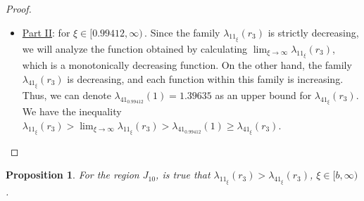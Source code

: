 \documentclass[final,11pt]{article}
\numberwithin{equation}{section}
\newtheorem{proposition}[theorem]{Proposition}
\theoremstyle{definition}
\begin{document}
\begin{proof}
\begin{itemize}
\item \underline{Part II}: for $\xi\in[0.99412, \infty)$\,. Since the family $\lambda_{11_\xi}(r_3)$ is strictly decreasing, we will analyze the function obtained by calculating $\lim_{\xi\rightarrow \infty} \lambda_{11_\xi}(r_3)$, which is a monotonically decreasing function. On the other hand, the family $\lambda_{41_\xi}(r_3)$ is decreasing, and each function within this family is increasing. Thus, we can denote $\lambda_{41_{0.99412}}(1) = 1.39635$ as an upper bound for $\lambda_{41_\xi}(r_3)$.  We have the inequality $\lambda_{11_\xi}(r_3) > \lim_{\xi\rightarrow \infty} \lambda_{11_\xi}(r_3) >\lambda_{41_{0.99412}}(1)\geq \lambda_{41_\xi}(r_3)$.
\end{itemize}
\end{proof}

\begin{proposition}\label{proposicionJ10}
For the region $J_{10}$, is true that $\lambda_{11_{\xi}}(r_{3})>\lambda_{41_{\xi}}(r_{3})$, $\xi\in[b,\infty)$.
\end{proposition}
\end{document}
